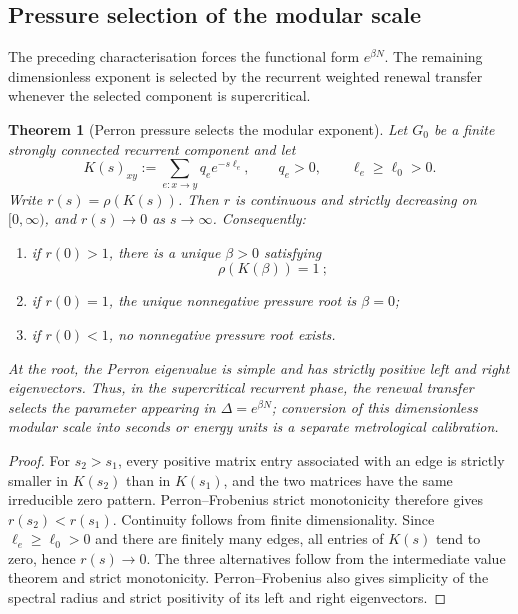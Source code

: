 \documentclass[11pt]{article}
\newtheorem{theorem}{Theorem}[section]
\theoremstyle{definition}
\theoremstyle{remark}
\begin{document}
\subsection{Pressure selection of the modular scale}
\label{subsec:pressure-selection}

The preceding characterisation forces the functional form \(e^{\beta N}\).
The remaining dimensionless exponent is selected by the recurrent weighted
renewal transfer whenever the selected component is supercritical.

\begin{theorem}[Perron pressure selects the modular exponent]
\label{thm:pressure-selects-beta}
Let \(G_0\) be a finite strongly connected recurrent component and let
\[
   K(s)_{xy}
   :=\sum_{e:x\to y} q_e e^{-s\ell_e},
   \qquad q_e>0,\qquad \ell_e\ge\ell_0>0 .
\]
Write \(r(s)=\rho(K(s))\).  Then \(r\) is continuous and strictly decreasing on
\([0,\infty)\), and \(r(s)\to0\) as \(s\to\infty\).  Consequently:
\begin{enumerate}[label=\textup{(\roman*)},leftmargin=2.4em]
\item if \(r(0)>1\), there is a unique \(\beta>0\) satisfying
      \[
         \boxed{\ \rho(K(\beta))=1\ };
      \]
\item if \(r(0)=1\), the unique nonnegative pressure root is \(\beta=0\);
\item if \(r(0)<1\), no nonnegative pressure root exists.
\end{enumerate}
At the root, the Perron eigenvalue is simple and has strictly positive left and
right eigenvectors.  Thus, in the supercritical recurrent phase, the renewal
transfer selects the parameter appearing in
\(\Delta=e^{\beta N}\); conversion of this dimensionless modular scale into
seconds or energy units is a separate metrological calibration.
\end{theorem}

\begin{proof}
For \(s_2>s_1\), every positive matrix entry associated with an edge is
strictly smaller in \(K(s_2)\) than in \(K(s_1)\), and the two matrices have
the same irreducible zero pattern.  Perron--Frobenius strict monotonicity
therefore gives \(r(s_2)<r(s_1)\).  Continuity follows from finite
dimensionality.  Since \(\ell_e\ge\ell_0>0\) and there are finitely many edges,
all entries of \(K(s)\) tend to zero, hence \(r(s)\to0\).  The three alternatives
follow from the intermediate value theorem and strict monotonicity.
Perron--Frobenius also gives simplicity of the spectral radius and strict
positivity of its left and right eigenvectors.
\end{proof}
\end{document}
